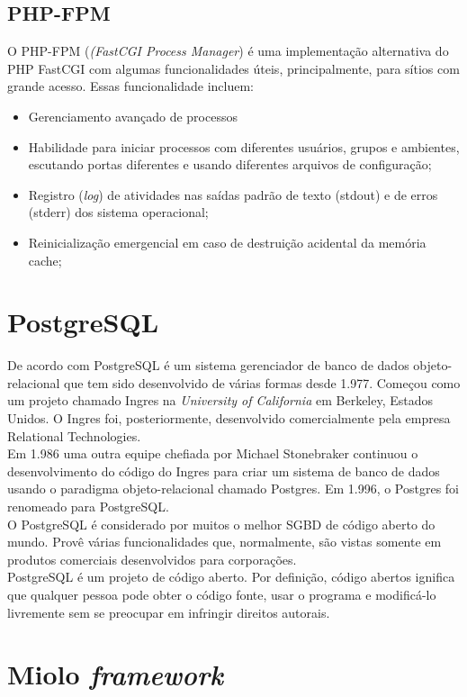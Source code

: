 \subsection{PHP-FPM}
O PHP-FPM (\textit{(FastCGI Process Manager}) é uma implementação alternativa do PHP FastCGI com algumas funcionalidades úteis, principalmente, para sítios com grande acesso. Essas funcionalidade incluem:
\begin{itemize}
	\item Gerenciamento avançado de processos
	\item Habilidade para iniciar processos com diferentes usuários, grupos e ambientes, escutando portas diferentes e usando diferentes arquivos de configuração;
	\item Registro (\textit{log}) de atividades nas saídas padrão de texto (stdout) e de erros (stderr) dos sistema operacional;
	\item Reinicialização emergencial em caso de destruição acidental da memória cache;
\end{itemize}
\section{PostgreSQL}
De acordo com  PostgreSQL é um sistema gerenciador de banco de dados objeto-relacional que tem sido desenvolvido de várias formas desde 1.977. Começou como um projeto chamado Ingres na \textit{University of California} em Berkeley, Estados Unidos. O Ingres foi, posteriormente, desenvolvido comercialmente pela empresa Relational Technologies.\\
Em 1.986 uma outra equipe chefiada por Michael Stonebraker continuou o desenvolvimento do código do Ingres para criar um sistema de banco de dados usando o paradigma objeto-relacional chamado Postgres. Em 1.996, o Postgres foi renomeado para PostgreSQL.\\
O PostgreSQL é considerado por muitos o melhor SGBD de código aberto do mundo. Provê várias funcionalidades que, normalmente, são vistas somente em produtos comerciais desenvolvidos para corporações.\\
PostgreSQL é um projeto de código aberto. Por definição, código abertos ignifica que qualquer pessoa pode obter o código fonte, usar o programa e modificá-lo livremente sem se preocupar em infringir direitos autorais.
\section{Miolo \textit{framework}}